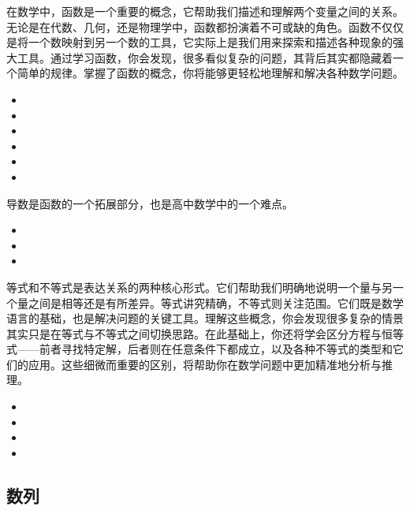 在数学中，函数是一个重要的概念，它帮助我们描述和理解两个变量之间的关系。无论是在代数、几何，还是物理学中，函数都扮演着不可或缺的角色。函数不仅仅是将一个数映射到另一个数的工具，它实际上是我们用来探索和描述各种现象的强大工具。通过学习函数，你会发现，很多看似复杂的问题，其背后其实都隐藏着一个简单的规律。掌握了函数的概念，你将能够更轻松地理解和解决各种数学问题。

\begin{itemize}
\item {}
\item {}
\item {}
\item {}
\item {}
\item {}
\end{itemize}

导数是函数的一个拓展部分，也是高中数学中的一个难点。

\begin{itemize}
\item {}
\item {}
\item {}
\end{itemize}

等式和不等式是表达关系的两种核心形式。它们帮助我们明确地说明一个量与另一个量之间是相等还是有所差异。等式讲究精确，不等式则关注范围。它们既是数学语言的基础，也是解决问题的关键工具。理解这些概念，你会发现很多复杂的情景其实只是在等式与不等式之间切换思路。在此基础上，你还将学会区分方程与恒等式——前者寻找特定解，后者则在任意条件下都成立，以及各种不等式的类型和它们的应用。这些细微而重要的区别，将帮助你在数学问题中更加精准地分析与推理。

\begin{itemize}
\item {}
\item {}
\item {}
\item {}
\end{itemize}

\subsection{数列}

